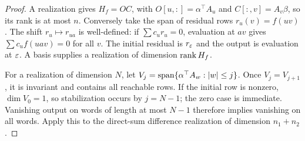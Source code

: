 \begin{proof}
A realization gives $H_f=OC$, with $O[u,:]=\alpha^\top A_u$ and $C[:,v]=A_v\beta$, so its rank is at most $n$. Conversely take the span of residual rows $r_u(v)=f(uv)$. The shift $r_u\mapsto r_{ua}$ is well-defined: if $\sum c_u r_u=0$, evaluation at $av$ gives $\sum c_u f(uav)=0$ for all $v$. The initial residual is $r_\varepsilon$ and the output is evaluation at $\varepsilon$. A basis supplies a realization of dimension $\operatorname{rank} H_f$.

For a realization of dimension $N$, let $V_j=\operatorname{span}\{\alpha^\top A_w:|w|\le j\}$. Once $V_j=V_{j+1}$, it is invariant and contains all reachable rows. If the initial row is nonzero, $\dim V_0=1$, so stabilization occurs by $j=N-1$; the zero case is immediate. Vanishing output on words of length at most $N-1$ therefore implies vanishing on all words. Apply this to the direct-sum difference realization of dimension $n_1+n_2$.
\end{proof}
